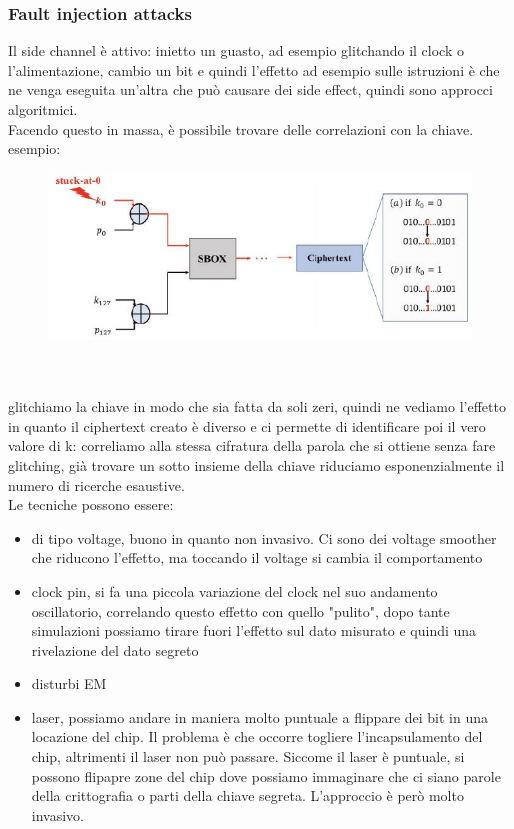 \documentclass[oneside, 12pt]{extbook}
\begin{document}
\subsubsection{Fault injection attacks}
Il side channel è attivo: inietto un guasto, ad esempio glitchando il clock o l'alimentazione, cambio un bit e quindi l'effetto ad esempio sulle istruzioni è che ne venga eseguita un'altra che può causare dei side effect, quindi sono approcci algoritmici.
\\Facendo questo in massa, è possibile trovare delle correlazioni con la chiave.
\\esempio:\\
\begin{figure}[!h]
	\includegraphics[scale=0.6]{immagini/hardware/fia.png}
\end{figure}
\\\\glitchiamo la chiave in modo che sia fatta da soli zeri, quindi ne vediamo l'effetto in quanto il ciphertext creato è diverso e ci permette di identificare poi il vero valore di k: correliamo alla stessa cifratura della parola che si ottiene senza fare glitching, già trovare un sotto insieme della chiave riduciamo esponenzialmente il numero di ricerche esaustive.
\\Le tecniche possono essere:
\begin{itemize}
	\item di tipo voltage, buono in quanto non invasivo. Ci sono dei voltage smoother che riducono l'effetto, ma toccando il voltage si cambia il comportamento
	\item clock pin, si fa una piccola variazione del clock nel suo andamento oscillatorio, correlando questo effetto con quello "pulito", dopo tante simulazioni possiamo tirare fuori l'effetto sul dato misurato e quindi una rivelazione del dato segreto
	\item disturbi EM
	\item laser, possiamo andare in maniera molto puntuale a flippare dei bit in una locazione del chip. Il problema è che occorre togliere l'incapsulamento del chip, altrimenti il laser non può passare. Siccome il laser è puntuale, si possono flipapre zone del chip dove possiamo immaginare che ci siano parole della crittografia o parti della chiave segreta. L'approccio è però molto invasivo.
\end{itemize}
\end{document}
